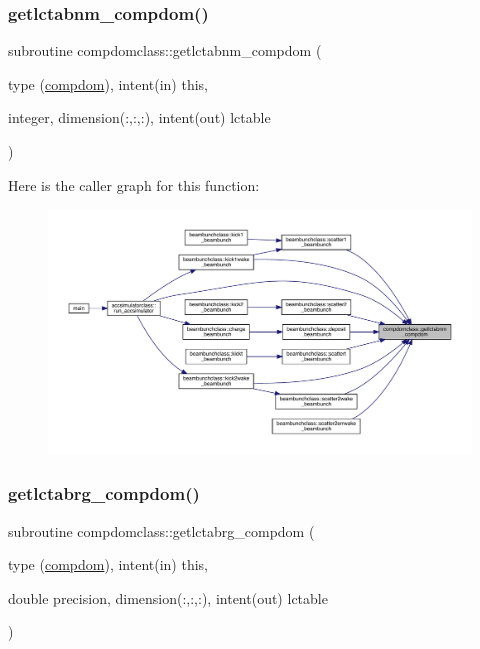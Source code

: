 \subsubsection{\texorpdfstring{getlctabnm\_compdom()}{getlctabnm\_compdom()}}
{\footnotesize\ttfamily subroutine compdomclass\+::getlctabnm\+\_\+compdom (\begin{DoxyParamCaption}\item[{type (\mbox{\hyperlink{namespacecompdomclass_structcompdomclass_1_1compdom}{compdom}}), intent(in)}]{this,  }\item[{integer, dimension(\+:,\+:,\+:), intent(out)}]{lctable }\end{DoxyParamCaption})}

Here is the caller graph for this function\+:\nopagebreak
\begin{figure}[H]
\begin{center}
\leavevmode
\includegraphics[width=350pt]{namespacecompdomclass_a7c7c1450a459bb1753ef8230ab0d7651_icgraph}
\end{center}
\end{figure}
\mbox{\label{namespacecompdomclass_ab679e7ac8218e1580f1a45a53d1fe9f1}} 
\subsubsection{\texorpdfstring{getlctabrg\_compdom()}{getlctabrg\_compdom()}}
{\footnotesize\ttfamily subroutine compdomclass\+::getlctabrg\+\_\+compdom (\begin{DoxyParamCaption}\item[{type (\mbox{\hyperlink{namespacecompdomclass_structcompdomclass_1_1compdom}{compdom}}), intent(in)}]{this,  }\item[{double precision, dimension(\+:,\+:,\+:), intent(out)}]{lctable }\end{DoxyParamCaption})}

